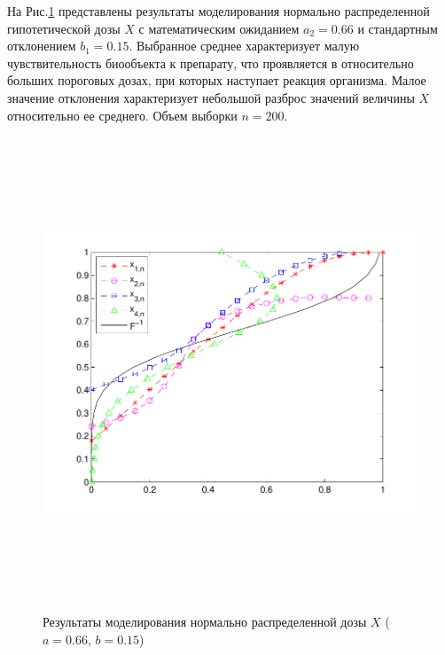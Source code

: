 \documentclass[a4paper,14pt,russian]{article}
\begin{document}
На Рис.\ref{Pic3} представлены результаты моделирования нормально распределенной гипотетической дозы $X$ с математическим ожиданием $a_2 = 0.66$ и стандартным отклонением $b_1 = 0.15$. Выбранное среднее характеризует малую чувствительность биообъекта к препарату, что проявляется в относительно больших пороговых дозах, при которых наступает реакция организма. Малое значение отклонения характеризует небольшой разброс значений величины $X$ относительно ее среднего. Объем выборки $n = 200$.
\begin{figure}[h]
\center
\caption{Результаты моделирования нормально распределенной дозы $X$ ($a=0.66$,  $b=0.15$)}\label{Pic3}
\includegraphics[width = 500pt,height = 400pt]{9.pdf}
\end{figure}

\newpage
\end{document}
